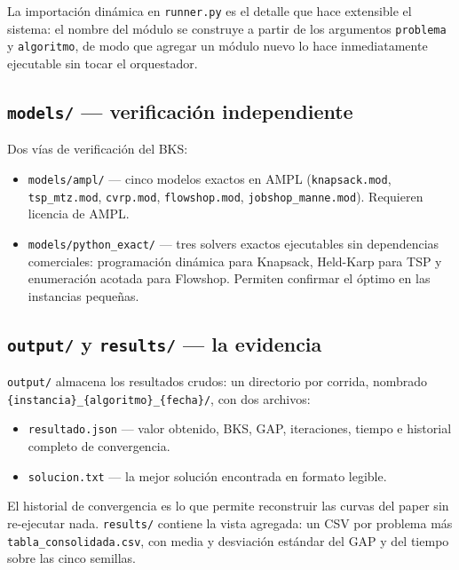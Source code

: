 La importación dinámica en \texttt{runner.py} es el detalle que hace
extensible el sistema: el nombre del módulo se construye a partir de los
argumentos \texttt{problema} y \texttt{algoritmo}, de modo que agregar un
módulo nuevo lo hace inmediatamente ejecutable sin tocar el orquestador.

\subsection{\texttt{models/} --- verificación independiente}

Dos vías de verificación del BKS:

\begin{itemize}
  \item \texttt{models/ampl/} --- cinco modelos exactos en AMPL
    (\texttt{knapsack.mod}, \texttt{tsp\_mtz.mod}, \texttt{cvrp.mod},
    \texttt{flowshop.mod}, \texttt{jobshop\_manne.mod}). Requieren licencia
    de AMPL.
  \item \texttt{models/python\_exact/} --- tres solvers exactos ejecutables
    sin dependencias comerciales: programación dinámica para Knapsack,
    Held-Karp para TSP y enumeración acotada para Flowshop. Permiten
    confirmar el óptimo en las instancias pequeñas.
\end{itemize}

\subsection{\texttt{output/} y \texttt{results/} --- la evidencia}

\texttt{output/} almacena los resultados crudos: un directorio por corrida,
nombrado \texttt{\{instancia\}\_\{algoritmo\}\_\{fecha\}/}, con dos archivos:

\begin{itemize}
  \item \texttt{resultado.json} --- valor obtenido, BKS, GAP, iteraciones,
    tiempo e historial completo de convergencia.
  \item \texttt{solucion.txt} --- la mejor solución encontrada en formato
    legible.
\end{itemize}

El historial de convergencia es lo que permite reconstruir las curvas del
paper sin re-ejecutar nada. \texttt{results/} contiene la vista agregada: un
CSV por problema más \texttt{tabla\_consolidada.csv}, con media y desviación
estándar del GAP y del tiempo sobre las cinco semillas.


